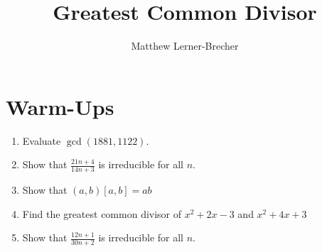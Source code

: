 \documentclass[11pt]{article}
\theoremstyle{theorem}
\theoremstyle{definition}
\theoremstyle{remark}
\theoremstyle{definition}
\theoremstyle{remark}
\begin{document}
\title{Greatest Common Divisor}
\author{Matthew Lerner-Brecher}
\maketitle

\section{Warm-Ups}
\begin{enumerate}
\item Evaluate $\gcd(1881,1122)$.
\item Show that $\frac{21n+4}{14n+3}$ is irreducible for all $n$.
\item Show that $(a,b)[a,b]=ab$
\item Find the greatest common divisor of $x^2+2x-3$ and $x^2+4x+3$
\item Show that $\frac{12n+1}{30n+2}$  is irreducible for all $n$.
\end{enumerate}
\end{document}
